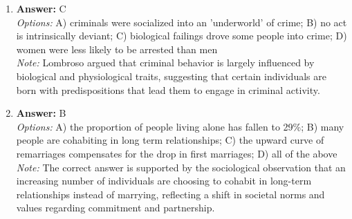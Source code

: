 \documentclass[12pt]{article}
\begin{document}
\begin{enumerate}[label=\arabic*.]
\item \textbf{Answer:} C
\\ \textit{Options:} A) criminals were socialized into an 'underworld' of crime; B) no act is intrinsically deviant; C) biological failings drove some people into crime; D) women were less likely to be arrested than men
\\ \textit{Note:} Lombroso argued that criminal behavior is largely influenced by biological and physiological traits, suggesting that certain individuals are born with predispositions that lead them to engage in criminal activity.
\item \textbf{Answer:} B
\\ \textit{Options:} A) the proportion of people living alone has fallen to 29\%; B) many people are cohabiting in long term relationships; C) the upward curve of remarriages compensates for the drop in first marriages; D) all of the above
\\ \textit{Note:} The correct answer is supported by the sociological observation that an increasing number of individuals are choosing to cohabit in long-term relationships instead of marrying, reflecting a shift in societal norms and values regarding commitment and partnership.
\end{enumerate}
\end{document}
